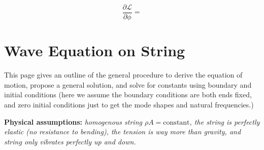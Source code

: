 \begin{equation*}
  \frac{\partial\mathscr{L}}{\partial\phi}=
\end{equation*}

\section{Wave Equation on String}

This page gives an outline of the general procedure to derive the equation of motion, propose a general solution, and solve for constants using boundary and initial conditions (here we assume the boundary conditions are both ends fixed, and zero initial conditions just to get the mode shapes and natural frequencies.)

\textbf{Physical assumptions:} \textit{homogenous string $\rho A=\text{constant}$, the string is perfectly elastic (no resistance to bending), the tension is way more than gravity, and string only vibrates perfectly up and down.}

